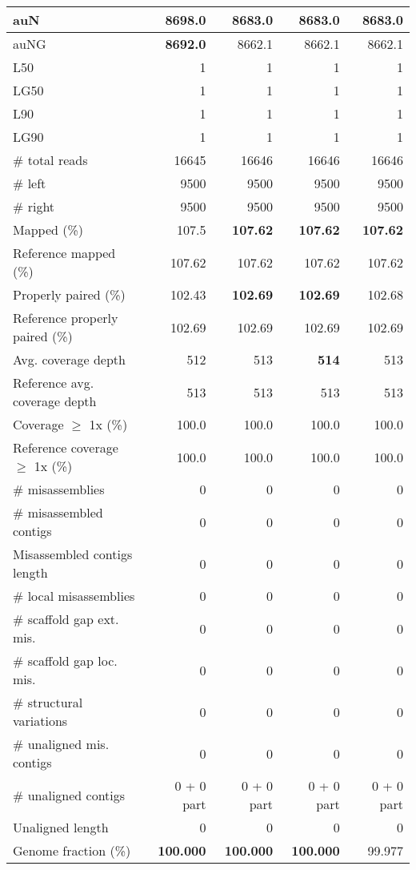 \documentclass[12pt,a4paper]{article}
\begin{document}
\begin{table}[ht]
\begin{center}
\begin{tabular}{|l*{4}{|r}|}
auN & {\bf 8698.0} & 8683.0 & 8683.0 & 8683.0 \\ \hline
auNG & {\bf 8692.0} & 8662.1 & 8662.1 & 8662.1 \\ \hline
L50 & 1 & 1 & 1 & 1 \\ \hline
LG50 & 1 & 1 & 1 & 1 \\ \hline
L90 & 1 & 1 & 1 & 1 \\ \hline
LG90 & 1 & 1 & 1 & 1 \\ \hline
\# total reads & 16645 & 16646 & 16646 & 16646 \\ \hline
\# left & 9500 & 9500 & 9500 & 9500 \\ \hline
\# right & 9500 & 9500 & 9500 & 9500 \\ \hline
Mapped (\%) & 107.5 & {\bf 107.62} & {\bf 107.62} & {\bf 107.62} \\ \hline
Reference mapped (\%) & 107.62 & 107.62 & 107.62 & 107.62 \\ \hline
Properly paired (\%) & 102.43 & {\bf 102.69} & {\bf 102.69} & 102.68 \\ \hline
Reference properly paired (\%) & 102.69 & 102.69 & 102.69 & 102.69 \\ \hline
Avg. coverage depth & 512 & 513 & {\bf 514} & 513 \\ \hline
Reference avg. coverage depth & 513 & 513 & 513 & 513 \\ \hline
Coverage $\geq$ 1x (\%) & 100.0 & 100.0 & 100.0 & 100.0 \\ \hline
Reference coverage $\geq$ 1x (\%) & 100.0 & 100.0 & 100.0 & 100.0 \\ \hline
\# misassemblies & 0 & 0 & 0 & 0 \\ \hline
\# misassembled contigs & 0 & 0 & 0 & 0 \\ \hline
Misassembled contigs length & 0 & 0 & 0 & 0 \\ \hline
\# local misassemblies & 0 & 0 & 0 & 0 \\ \hline
\# scaffold gap ext. mis. & 0 & 0 & 0 & 0 \\ \hline
\# scaffold gap loc. mis. & 0 & 0 & 0 & 0 \\ \hline
\# structural variations & 0 & 0 & 0 & 0 \\ \hline
\# unaligned mis. contigs & 0 & 0 & 0 & 0 \\ \hline
\# unaligned contigs & 0 + 0 part & 0 + 0 part & 0 + 0 part & 0 + 0 part \\ \hline
Unaligned length & 0 & 0 & 0 & 0 \\ \hline
Genome fraction (\%) & {\bf 100.000} & {\bf 100.000} & {\bf 100.000} & 99.977 \\ \hline

\end{tabular}
\end{center}
\end{table}
\end{document}
